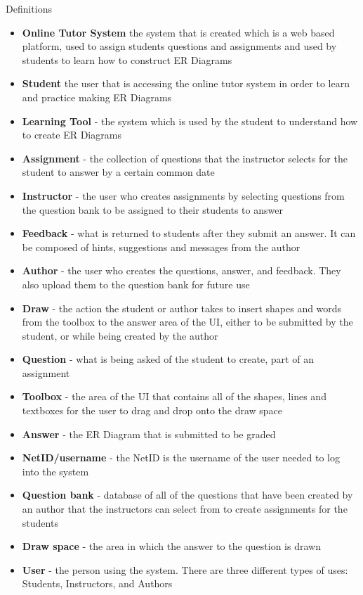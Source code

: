 	\begin{section}{Definitions}
 		\begin{itemize}
 			\item{\textbf{Online Tutor System}  the system that is created which is a web based platform, 
 			used to assign students questions and assignments and used by students to learn how to 
 			construct ER Diagrams}
			\item{\textbf{Student}  the user that is accessing the online tutor system in order to learn 
			and practice making ER Diagrams}
			\item{\textbf{Learning Tool} - the system which is used by the student to understand how to 
			create ER Diagrams}
			\item{\textbf{Assignment} - the collection of questions that the instructor selects for the 
			student to answer by a certain common date}
			\item{\textbf{Instructor} - the user who creates assignments by selecting questions from the 
			question bank to be assigned to their students to answer}
			\item{\textbf{Feedback} - what is returned to students after they submit an answer.  It can be 
			composed of hints, suggestions and messages from the author}
			\item{\textbf{Author} - the user who creates the questions, answer, and feedback.  They also 
			upload them to the question bank for future use}
			\item{\textbf{Draw} - the action the student or author takes to insert shapes and words from 
			the toolbox to the answer area of the UI, either to be submitted by the student, or while 
			being created by the author}
			\item{\textbf{Question} - what is being asked of the student to create, part of an assignment}
			\item{\textbf{Toolbox} - the area of the UI that contains all of the shapes, lines and textboxes 
			for the user to drag and drop onto the draw space}
			\item{\textbf{Answer} - the ER Diagram that is submitted to be graded}
			\item{\textbf{NetID/username} - the NetID is the username of the user needed to log into the 
			system}
			\item{\textbf{Question bank} - database of all of the questions that have been created by an 
			author that the instructors can select from to create assignments for the students}
			\item{\textbf{Draw space} - the area in which the answer to the question is drawn}
			\item{\textbf{User} - the person using the system. There are three different types of uses: 
			Students, Instructors, and Authors}
		\end{itemize}
	\end{section}
